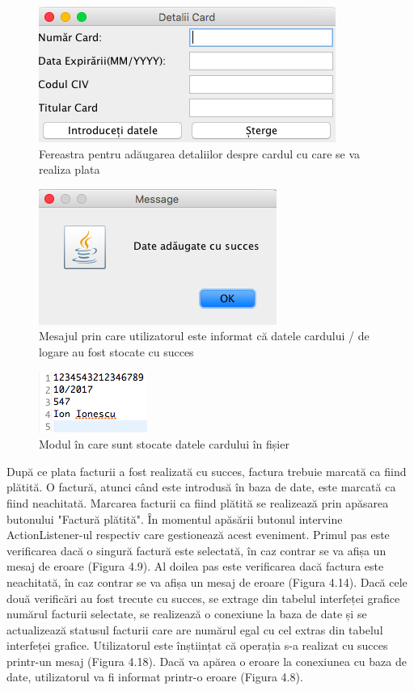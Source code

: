 \documentclass[12pt]{book}
\begin{document}
\begin{figure}[!ht]
	\centering
	\includegraphics{DetaliiCard}
	\caption{Fereastra pentru adăugarea detaliilor despre cardul cu care se va realiza plata}
\end{figure}

\begin{figure}[!ht]
	\centering
	\includegraphics{DateCardSucces}
	\caption{Mesajul prin care utilizatorul este informat că datele cardului / de logare au fost stocate cu succes}
\end{figure}

\begin{figure}[!ht]
	\centering
	\includegraphics{DetaliiCardDocument}
	\caption{Modul în care sunt stocate datele cardului în fișier}
\end{figure}

După ce plata facturii a fost realizată cu succes, factura trebuie marcată ca fiind plătită. O factură, atunci când este introdusă în baza de date, este marcată ca fiind neachitată. Marcarea facturii ca fiind plătită se realizează prin apăsarea butonului "Factură plătită". În momentul apăsării butonul intervine ActionListener-ul respectiv care gestionează acest eveniment. Primul pas este verificarea dacă o singură factură este selectată, în caz contrar se va afișa un mesaj de eroare (Figura 4.9). Al doilea pas este verificarea dacă factura este neachitată, în caz contrar se va afișa un mesaj de eroare (Figura 4.14). Dacă cele două verificări au fost trecute cu succes, se extrage din tabelul interfeței grafice numărul facturii selectate, se realizează o conexiune la baza de date și se actualizează statusul facturii care are numărul egal cu cel extras din tabelul interfeței grafice. Utilizatorul este înștiințat că operația s-a realizat cu succes printr-un mesaj (Figura 4.18). Dacă va apărea o eroare la conexiunea cu baza de date, utilizatorul va fi informat printr-o eroare (Figura 4.8).
\end{document}
